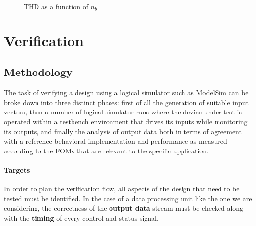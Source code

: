 \begin{figure}
	\caption{THD as a function of $n_b$}
	\label{fig:thdplot}
\end{figure}

\section{Verification}
\subsection{Methodology}
The task of verifying a design using a logical simulator such as ModelSim can be broke down into three distinct phases: first of all the generation of suitable input vectors, then a number of logical simulator runs where the device-under-test is operated within a testbench environment that drives its inputs while monitoring its outputs, and finally the analysis of output data both in terms of agreement with a reference behavioral implementation and performance as measured according to the FOMs that are relevant to the specific application.

\paragraph{Targets} In order to plan the verification flow, all aspects of the design that need to be tested must be identified. In the case of a data processing unit like the one we are considering, the correctness of the \textbf{output data} stream must be checked along with the \textbf{timing} of every control and status signal.

